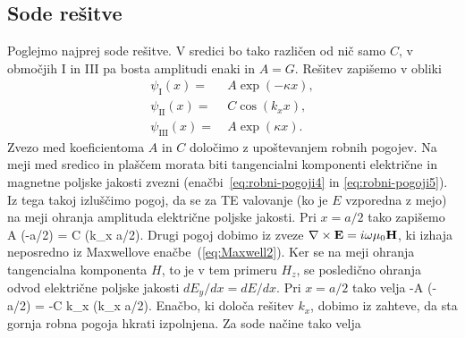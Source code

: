 \subsection*{Sode rešitve}
Poglejmo najprej sode rešitve. V sredici bo tako različen od nič samo $C$, 
v območjih I in III pa bosta amplitudi enaki in $A = G$. Rešitev zapišemo v obliki
\begin{align}
\psi_{\mathrm{I}}(x) =&~ A \exp(-\kappa x), \\
\psi_{\mathrm{II}}(x) =&~ C \cos(k_x x),\\
\psi_{\mathrm{III}}(x) =&~ A \exp(\kappa x).
\end{align}
Zvezo med koeficientoma $A$ in $C$ določimo z upoštevanjem robnih pogojev. Na meji
med sredico in plaščem morata biti tangencialni komponenti 
električne in magnetne poljske jakosti zvezni (enačbi~\ref{eq:robni-pogoji4} in 
\ref{eq:robni-pogoji5}). Iz tega takoj 
izluščimo pogoj, da se za TE valovanje (ko je $E$ vzporedna z mejo) 
na meji ohranja amplituda električne poljske jakosti. Pri $x = a/2$ tako zapišemo
\beq
A \exp(-\kappa a/2) = C \cos(k_x a/2).
\eeq
Drugi pogoj dobimo iz zveze $\nabla\times{\bf E}=i\omega\mu_{0}{\bf H}$, ki izhaja
neposredno iz Maxwellove enačbe~(\ref{eq:Maxwell2}). Ker se na meji ohranja
tangencialna komponenta $H$, to je v tem primeru $H_z$, se posledično ohranja 
odvod električne poljske jakosti $dE_y/dx = dE/dx$. 
Pri $x = a/2$ tako velja
\beq
-A \kappa \exp(-\kappa a/2) = -C k_x \sin(k_x a/2).
\eeq
Enačbo, ki določa rešitev $k_x$, dobimo iz zahteve, da sta gornja robna 
pogoja hkrati izpolnjena. Za sode načine tako velja

